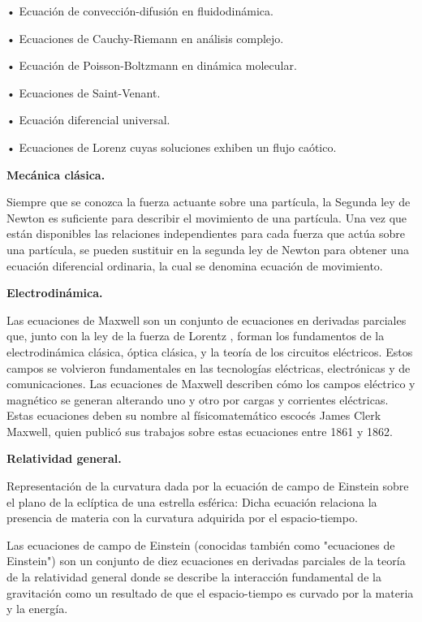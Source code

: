 \textcolor{gris}{•	Ecuación de convección-difusión en fluidodinámica.}

\textcolor{gris}{•	Ecuaciones de Cauchy-Riemann en análisis complejo.}

\textcolor{gris}{•	Ecuación de Poisson-Boltzmann en dinámica molecular.}

\textcolor{gris}{•	Ecuaciones de Saint-Venant.}

\textcolor{gris}{•	Ecuación diferencial universal.}

\textcolor{gris}{•	Ecuaciones de Lorenz cuyas soluciones exhiben un flujo caótico.}

\textcolor{gris}{\textbf{Mecánica clásica.}}


\textcolor{gris}{Siempre que se conozca la fuerza actuante sobre una partícula, la Segunda ley de Newton es suficiente para describir el movimiento de una partícula. Una vez que están disponibles las relaciones independientes para cada fuerza que actúa sobre una partícula, se pueden sustituir en la segunda ley de Newton para obtener una ecuación diferencial ordinaria, la cual se denomina ecuación de movimiento}.

\textcolor{gris}{\textbf{Electrodinámica.}}

\textcolor{gris}{Las ecuaciones de Maxwell son un conjunto de ecuaciones en derivadas parciales que, junto con la ley de la fuerza de Lorentz , forman los fundamentos de la electrodinámica clásica, óptica clásica, y la teoría de los circuitos eléctricos. Estos campos se volvieron fundamentales en las tecnologías eléctricas, electrónicas y de comunicaciones. Las ecuaciones de Maxwell describen cómo los campos eléctrico y magnético se generan alterando uno y otro por cargas y corrientes eléctricas. Estas ecuaciones deben su nombre al físicomatemático escocés James Clerk Maxwell, quien publicó sus trabajos sobre estas ecuaciones entre 1861 y 1862.}

\textcolor{gris}{\textbf{Relatividad general.}}

\textcolor{gris}{Representación de la curvatura dada por la ecuación de campo de Einstein sobre el plano de la eclíptica de una estrella esférica: Dicha ecuación relaciona la presencia de materia con la curvatura adquirida por el espacio-tiempo.}

\textcolor{gris}{Las ecuaciones de campo de Einstein (conocidas también como "ecuaciones de Einstein") son un conjunto de diez ecuaciones en derivadas parciales de la teoría de la relatividad general donde se describe la interacción fundamental de la gravitación como un resultado de que el espacio-tiempo es curvado por la materia y la energía.}
 
